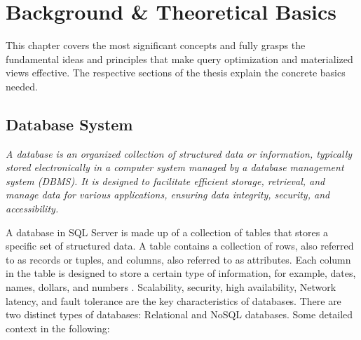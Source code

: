 \section{Background \& Theoretical Basics }

This chapter covers the most significant concepts and fully grasps the fundamental ideas and principles that make query optimization and materialized views effective. The respective sections of the thesis explain the concrete basics needed.

\subsection{ Database System}
\noindent\textit{A database is an organized collection of structured data or information, typically stored electronically in a computer system managed by a database management system (DBMS). It is designed to facilitate efficient storage, retrieval, and manage data for various applications, ensuring data integrity, security, and accessibility\cite{studyX-studyX-024}.}\vspace{.4cm}

A database in SQL Server is made up of a collection of tables that stores a specific set of structured data. A table contains a collection of rows, also referred to as records or tuples, and columns, also referred to as attributes. Each column in the table is designed to store a certain type of information, for example, dates, names, dollars, and numbers \cite{williamdassafmsft-2024}. Scalability, security, high availability, Network latency, and fault tolerance are the key characteristics of databases. There are two distinct types of databases: Relational and NoSQL databases. Some detailed context in the following: 

